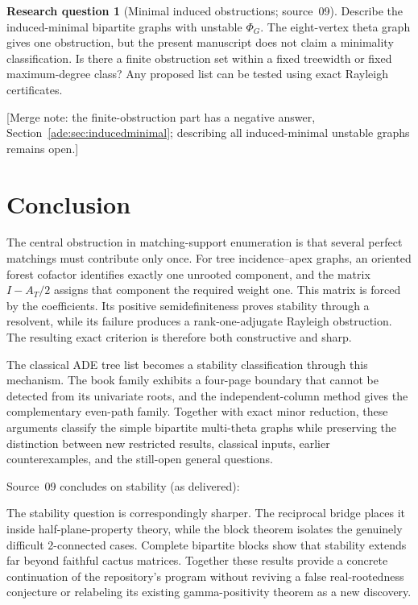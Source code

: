 \documentclass[11pt]{article}
\numberwithin{equation}{section}
\theoremstyle{definition}
\newtheorem{question}{Research question}%
\begin{document}
\begin{question}[Minimal induced obstructions; source~09]\label{ade:q:last}
Describe the induced-minimal bipartite graphs with unstable $\Phi_G$.
The eight-vertex theta graph gives one obstruction, but the present
manuscript does not claim a minimality classification. Is there a finite
obstruction set within a fixed treewidth or fixed maximum-degree class?
Any proposed list can be tested using exact Rayleigh certificates.
\end{question}

[Merge note: the finite-obstruction part has a negative answer,
Section~\ref{ade:sec:inducedminimal}; describing all induced-minimal
unstable graphs remains open.]

\section{Conclusion}

The central obstruction in matching-support enumeration is that several
perfect matchings must contribute only once.  For tree incidence--apex
graphs, an oriented forest cofactor identifies exactly one unrooted
component, and the matrix $I-A_T/2$ assigns that component the required
weight one.  This matrix is forced by the coefficients.  Its positive
semidefiniteness proves stability through a resolvent, while its failure
produces a rank-one-adjugate Rayleigh obstruction.  The resulting exact
criterion is therefore both constructive and sharp.

The classical ADE tree list becomes a stability classification through
this mechanism.  The book family exhibits a four-page boundary that
cannot be detected from its univariate roots, and the independent-column
method gives the complementary even-path family.  Together with exact
minor reduction, these arguments classify the simple bipartite
multi-theta graphs while preserving the distinction between new
restricted results, classical inputs, earlier counterexamples, and the
still-open general questions.

Source~09 concludes on stability (as delivered):

The stability question is correspondingly sharper. The reciprocal bridge
places it inside half-plane-property theory, while the block theorem
isolates the genuinely difficult 2-connected cases. Complete bipartite
blocks show that stability extends far beyond faithful cactus matrices.
Together these results provide a concrete continuation of the repository's
program without reviving a false real-rootedness conjecture or relabeling
its existing gamma-positivity theorem as a new discovery.
\end{document}
